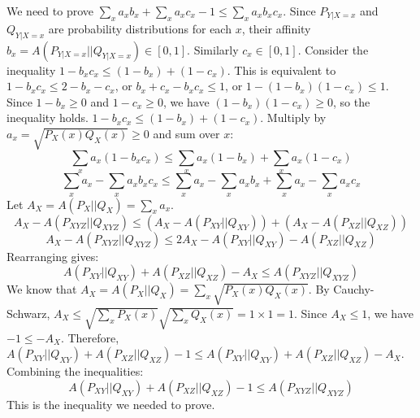 \documentclass{article}
\begin{document}
We need to prove $\sum_x a_x b_x + \sum_x a_x c_x - 1 \le \sum_x a_x b_x c_x$.
Since $P_{Y|X=x}$ and $Q_{Y|X=x}$ are probability distributions for each $x$, their affinity $b_x = A(P_{Y|X=x} || Q_{Y|X=x}) \in [0, 1]$. Similarly $c_x \in [0, 1]$.
Consider the inequality $1 - b_x c_x \le (1-b_x) + (1-c_x)$.
This is equivalent to $1 - b_x c_x \le 2 - b_x - c_x$, or $b_x + c_x - b_x c_x \le 1$, or $1 - (1-b_x)(1-c_x) \le 1$.
Since $1-b_x \ge 0$ and $1-c_x \ge 0$, we have $(1-b_x)(1-c_x) \ge 0$, so the inequality holds.
$1 - b_x c_x \le (1-b_x) + (1-c_x)$.
Multiply by $a_x = \sqrt{P_X(x) Q_X(x)} \ge 0$ and sum over $x$:
\[ \sum_x a_x (1 - b_x c_x) \le \sum_x a_x (1 - b_x) + \sum_x a_x (1 - c_x) \]
\[ \sum_x a_x - \sum_x a_x b_x c_x \le \sum_x a_x - \sum_x a_x b_x + \sum_x a_x - \sum_x a_x c_x \]
Let $A_X = A(P_X || Q_X) = \sum_x a_x$.
\[ A_X - A(P_{XYZ} || Q_{XYZ}) \le (A_X - A(P_{XY} || Q_{XY})) + (A_X - A(P_{XZ} || Q_{XZ})) \]
\[ A_X - A(P_{XYZ} || Q_{XYZ}) \le 2 A_X - A(P_{XY} || Q_{XY}) - A(P_{XZ} || Q_{XZ}) \]
Rearranging gives:
\[ A(P_{XY} || Q_{XY}) + A(P_{XZ} || Q_{XZ}) - A_X \le A(P_{XYZ} || Q_{XYZ}) \]
We know that $A_X = A(P_X || Q_X) = \sum_x \sqrt{P_X(x) Q_X(x)}$. By Cauchy-Schwarz, $A_X \le \sqrt{\sum_x P_X(x)} \sqrt{\sum_x Q_X(x)} = 1 \times 1 = 1$.
Since $A_X \le 1$, we have $-1 \le -A_X$.
Therefore, $A(P_{XY} || Q_{XY}) + A(P_{XZ} || Q_{XZ}) - 1 \le A(P_{XY} || Q_{XY}) + A(P_{XZ} || Q_{XZ}) - A_X$.
Combining the inequalities:
\[ A(P_{XY} || Q_{XY}) + A(P_{XZ} || Q_{XZ}) - 1 \le A(P_{XYZ} || Q_{XYZ}) \]
This is the inequality we needed to prove.
\end{document}
